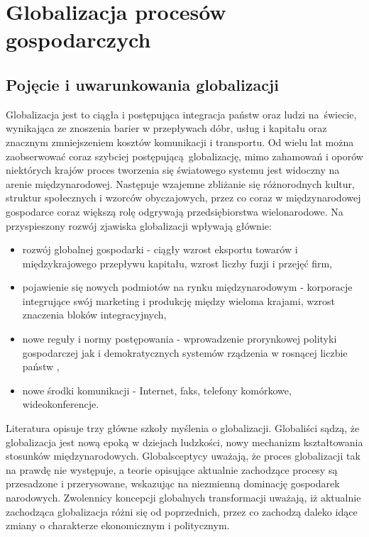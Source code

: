 \documentclass[12pt]{extarticle}
\begin{document}
\section{Globalizacja procesów gospodarczych}

\subsection{Pojęcie i uwarunkowania globalizacji}

Globalizacja jest to ciągła i postępująca integracja państw oraz ludzi na świecie, wynikająca ze znoszenia barier w przepływach dóbr, usług i kapitału oraz znacznym zmniejszeniem kosztów komunikacji i transportu. Od wielu lat można zaobserwować coraz szybciej postępującą globalizację, mimo zahamowań i oporów niektórych krajów proces tworzenia się światowego systemu jest widoczny na arenie międzynarodowej. Następuje wzajemne zbliżanie się różnorodnych kultur, struktur społecznych i wzorców obyczajowych, przez co coraz w międzynarodowej gospodarce coraz większą rolę odgrywają przedsiębiorstwa wielonarodowe. Na przyspieszony rozwój zjawiska globalizacji wpływają głównie:

\begin{itemize}
	\item rozwój globalnej gospodarki - ciągły wzrost eksportu towarów i międzykrajowego przepływu kapitału, wzrost liczby fuzji i przejęć firm,
	\item pojawienie się nowych podmiotów na rynku międzynarodowym - korporacje integrujące swój marketing i produkcję między wieloma krajami, wzrost znaczenia bloków integracyjnych,
	\item nowe reguły i normy postępowania - wprowadzenie prorynkowej polityki gospodarczej jak i demokratycznych systemów rządzenia w rosnącej liczbie państw ,
	\item nowe środki komunikacji - Internet, faks, telefony komórkowe, wideokonferencje.
\end{itemize}

Literatura opisuje trzy główne szkoły myślenia o globalizacji. Globaliści sądzą, że globalizacja jest nową epoką w dziejach ludzkości, nowy mechanizm kształtowania stosunków międzynarodowych. Globalsceptycy uważają, że proces globalizacji tak na prawdę nie występuje, a teorie opisujące aktualnie zachodzące procesy są przesadzone i przerysowane, wskazując na niezmienną dominację gospodarek narodowych. Zwolennicy koncepcji globalnych transformacji uważają, iż aktualnie zachodząca globalizacja różni się od poprzednich, przez co zachodzą daleko idące zmiany o charakterze ekonomicznym i politycznym.
\end{document}
